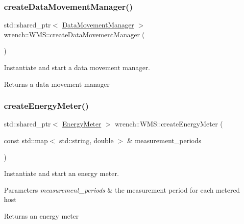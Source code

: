 \subsubsection{\texorpdfstring{create\+Data\+Movement\+Manager()}{createDataMovementManager()}}
{\footnotesize\ttfamily std\+::shared\+\_\+ptr$<$ \hyperlink{classwrench_1_1_data_movement_manager}{Data\+Movement\+Manager} $>$ wrench\+::\+W\+M\+S\+::create\+Data\+Movement\+Manager (\begin{DoxyParamCaption}{ }\end{DoxyParamCaption})\hspace{0.3cm}{\ttfamily [protected]}}



Instantiate and start a data movement manager. 

\begin{DoxyReturn}{Returns}
a data movement manager 
\end{DoxyReturn}
\mbox{\label{classwrench_1_1_w_m_s_a4bcbecc3ae781f439d3c9979a5feb9de}} 
\subsubsection{\texorpdfstring{create\+Energy\+Meter()}{createEnergyMeter()}\hspace{0.1cm}{\footnotesize\ttfamily [1/2]}}
{\footnotesize\ttfamily std\+::shared\+\_\+ptr$<$ \hyperlink{classwrench_1_1_energy_meter}{Energy\+Meter} $>$ wrench\+::\+W\+M\+S\+::create\+Energy\+Meter (\begin{DoxyParamCaption}\item[{const std\+::map$<$ std\+::string, double $>$ \&}]{measurement\+\_\+periods }\end{DoxyParamCaption})\hspace{0.3cm}{\ttfamily [protected]}}



Instantiate and start an energy meter. 


\begin{DoxyParams}{Parameters}
{\em measurement\+\_\+periods} & the measurement period for each metered host\\
\hline
\end{DoxyParams}
\begin{DoxyReturn}{Returns}
an energy meter 
\end{DoxyReturn}
\mbox{\label{classwrench_1_1_w_m_s_a37c10d2524485e308919672ad59985c4}} 
